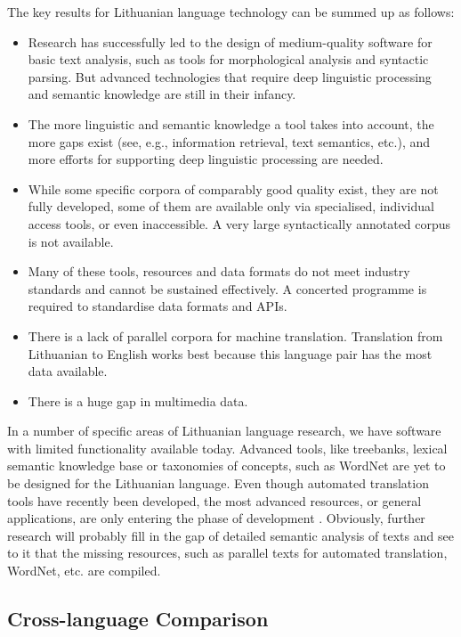 \begin{multicols}{2}
The key results for Lithuanian language technology can be summed up as follows:

\begin{itemize}
\item Research has successfully led to the design of medium-quality software for basic text analysis, such as tools for morphological analysis and syntactic parsing. But advanced technologies that require deep linguistic processing and semantic knowledge are still in their infancy. 
\item The more linguistic and semantic knowledge a tool takes into account, the more gaps exist (see, e.g., information retrieval, text semantics, etc.), and more efforts for supporting deep linguistic processing are needed. 
\item While some specific corpora of comparably good quality exist, they are not fully developed, some of them are available only via specialised, individual access tools, or even inaccessible. A very large syntactically annotated corpus is not available. 
\item Many of these tools, resources and data formats do not meet industry standards and cannot be sustained effectively. A concerted programme is required to standardise data formats and APIs. 
\item There is a lack of parallel corpora for machine translation. Translation from Lithuanian to English works best because this language pair has the most data available.
\item There is a huge gap in multimedia data.
\end{itemize}

In a number of specific areas of Lithuanian language research, we have software with limited functionality available today.  Advanced tools, like treebanks, lexical semantic knowledge base or taxonomies of concepts, such as WordNet are yet to be designed for the Lithuanian language. Even though automated translation tools have recently been developed, the most advanced resources, or general applications, are only entering the phase of development  \cite{td1}. Obviously, further research will probably fill in the gap of detailed semantic analysis of texts and see to it that the missing resources, such as parallel texts for automated translation, WordNet, etc. are compiled.

\subsection{Cross-language Comparison}


\end{multicols}
